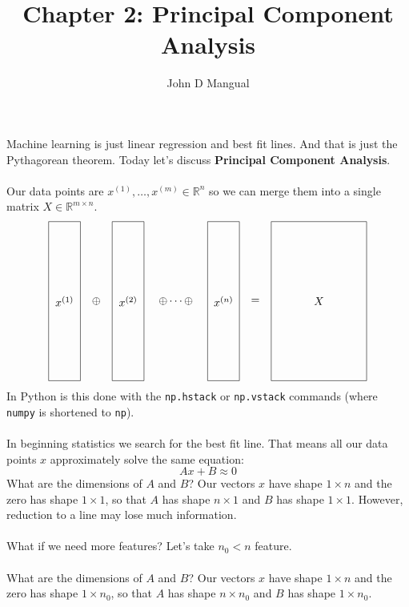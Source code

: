 \documentclass[12pt]{article}
\title{\textbf{Chapter 2: Principal Component Analysis}}
\author{John D Mangual}
\date{}
\begin{document}
\selectfont \fontsize{15}{20}\selectfont

\maketitle

\noindent Machine learning is just linear regression and best fit lines.  And that is just the Pythagorean theorem.  Today let's discuss \textbf{Principal Component Analysis}. \\ \\
Our data points are $x^{(1)}, \dots, x^{(m)} \in \mathbb{R}^n $ so we can merge them into a single matrix $X \in \mathbb{R}^{m \times n}$.
$$ \begin{tikzpicture}  
\draw (0,0)--(1,0)--(1,5)--(0,5)--cycle; 
\node at (0.5,2.5) {$x^{(1)}$};

\node at (1.5,2.5) {$\oplus$};

\draw (2,0)--(3,0)--(3,5)--(2,5)--cycle; 
\node at (2.5,2.5) {$x^{(2)}$};

\node at (4,2.5) {$\oplus \dots \oplus $};

\draw (5,0)--(6,0)--(6,5)--(5,5)--cycle; 
\node at (5.5,2.5) {$x^{(n)}$};

\node at (6.5,2.5) {$=$};

\draw (7,0)--(10,0)--(10,5)--(7,5)--cycle;
\node at (8.5,2.5) {$X$};

\end{tikzpicture} $$
In Python is this done with the \texttt{np.hstack} or \texttt{np.vstack} commands (where \texttt{numpy} is shortened to \texttt{np}). \\ \\
In beginning statistics we search for the best fit line.  That means all our data points $x$  approximately solve the same equation:
$$ A x + B \approx 0 $$ 
What are the dimensions of $A$ and $B$?  Our vectors $x$ have shape $1 \times n$ and the zero has shape $1 \times 1$, so that $A$ has shape $n \times 1$ and $B$ has shape $1 \times 1$.  However, reduction to a line may lose much information.  \\ \\
What if we need more features?  Let's take $n_0 < n$ feature. \\ \\
What are the dimensions of $A$ and $B$?  Our vectors $x$ have shape $1 \times n$ and the zero has shape $1 \times n_0$, so that $A$ has shape $n \times n_0$ and $B$ has shape $1 \times n_0$.  
\end{document}

